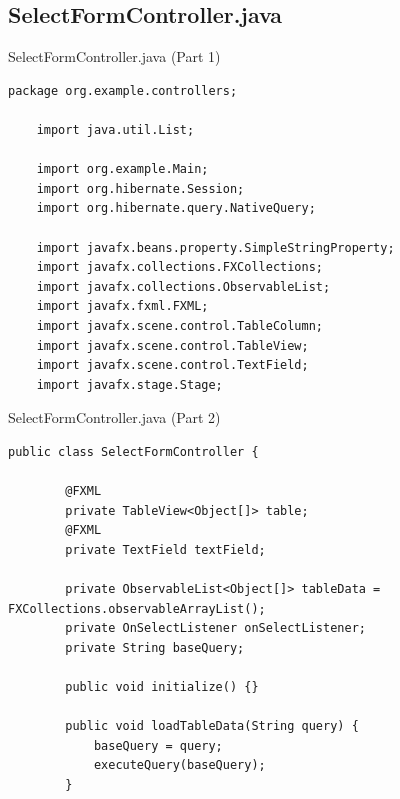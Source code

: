 \documentclass[aspectratio=169, table]{beamer}
\begin{document}
\subsection{SelectFormController.java}
\begin{frame}[fragile]{SelectFormController.java (Part 1)}
\vspace{20pt}
\begin{lstlisting}[style=JavaStyle]
	package org.example.controllers;
	
	import java.util.List;
	
	import org.example.Main;
	import org.hibernate.Session;
	import org.hibernate.query.NativeQuery;
	
	import javafx.beans.property.SimpleStringProperty;
	import javafx.collections.FXCollections;
	import javafx.collections.ObservableList;
	import javafx.fxml.FXML;
	import javafx.scene.control.TableColumn;
	import javafx.scene.control.TableView;
	import javafx.scene.control.TextField;
	import javafx.stage.Stage;
\end{lstlisting}
\end{frame}

\begin{frame}[fragile]{SelectFormController.java (Part 2)}
\vspace{20pt}
\begin{lstlisting}[style=JavaStyle]
	public class SelectFormController {
		
		@FXML
		private TableView<Object[]> table;
		@FXML
		private TextField textField;
		
		private ObservableList<Object[]> tableData = FXCollections.observableArrayList();
		private OnSelectListener onSelectListener;
		private String baseQuery;
		
		public void initialize() {}
		
		public void loadTableData(String query) {
			baseQuery = query;
			executeQuery(baseQuery);
		}
	\end{lstlisting}
\end{frame}
\end{document}
